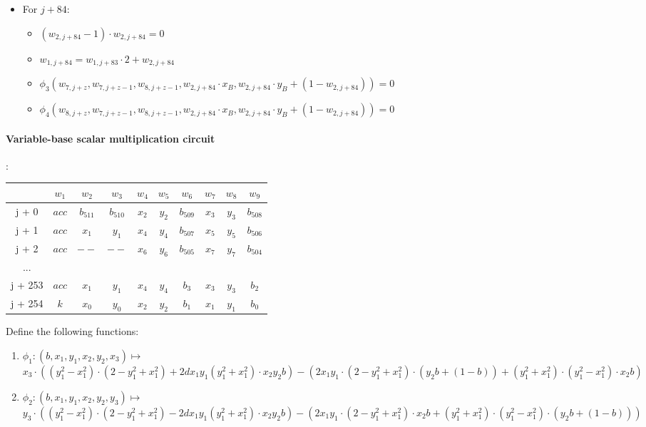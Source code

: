 \begin{itemize}
    \item For $j + 84$:
        \begin{itemize}
        	 \item $(w_{2, j + 84} - 1) \cdot w_{2, j + 84} = 0$ 
            \item $w_{1, j + 84} = w_{1, j + 83} \cdot 2 + w_{2, j + 84}$
            \item $\phi_3(w_{7, j + z}, w_{7, j + z - 1}, w_{8, j + z - 1}, w_{2, j + 84} \cdot x_B, w_{2, j + 84} \cdot y_B + (1 - w_{2, j + 84}) ) = 0$
            \item $\phi_4(w_{8, j + z}, w_{7, j + z - 1}, w_{8, j + z - 1}, w_{2, j + 84} \cdot x_B, w_{2, j + 84} \cdot y_B + (1 - w_{2, j + 84}) ) = 0$
        \end{itemize}
\end{itemize}

\paragraph{Variable-base scalar multiplication circuit}:
\begin{center}
    \begin{tabular}{ c|c|c|c|c|c|c|c|c|c }
        & $w_1$  & $w_2$  & $w_3$  & $w_4$  & $w_5$  & $w_6$ & $w_7$ & $w_8$ & $w_9$  \\
        \hline
        j + 0  & $acc$  & $b_{511}$ & $b_{510}$ & $x_2$   & $y_2$ & $b_{509}$  & $x_3$ & $y_3$ & $b_{508}$    \\
        j + 1  & $acc$ & $x_1$  & $ y_1$  & $x_4$ & $ y_4$ & $b_{507}$  & $x_5$ & $y_5$ & $b_{506}$ \\
        j + 2  & $acc$  & $--$ & $--$  & $x_6$ & $y_6$ & $b_{505}$ & $x_7$ & $y_7$  & $b_{504}$  \\
        ...     &             &            &           &             &           \\
        j + 253  & $acc$ & $x_1$  & $ y_1$  & $x_4$ & $ y_4$ & $b_{3}$  & $x_3$ & $y_3$ & $b_{2}$ \\
        j + 254  & $k$ & $x_0$ & $y_0$ & $x_2$ & $y_2$ & $b_{1}$   & $x_1$ & $y_1$  & $b_{0}$    \\
    \end{tabular}
\end{center}

Define the following functions:
\begin{enumerate}
    \item $\phi_1: (b, x_1, y_1, x_2, y_2, x_3) \mapsto $ \\
        $x_3 \cdot ((y_1^2 - x_1^2)\cdot(2 - y_1^2 + x_1^2) + 2dx_1y_1(y_1^2+x_1^2) \cdot x_2y_2b ) - (2x_1y_1\cdot(2 - y_1^2 +x_1^2)\cdot (y_2b + (1 - b)) + (y_1^2 + x_1^2)\cdot(y_1^2 - x_1^2)\cdot x_2 b)$

    \item $\phi_2: (b, x_1, y_1, x_2, y_2, y_3) \mapsto $ \\
        $y_3 \cdot ((y_1^2 - x_1^2)\cdot(2 - y_1^2 + x_1^2) - 2dx_1y_1(y_1^2+x_1^2) \cdot x_2y_2b ) - (2x_1y_1\cdot(2 - y_1^2 +x_1^2)\cdot x_2b + (y_1^2 + x_1^2)\cdot(y_1^2 - x_1^2)\cdot (y_2b + (1 - b)))$
\end{enumerate}

